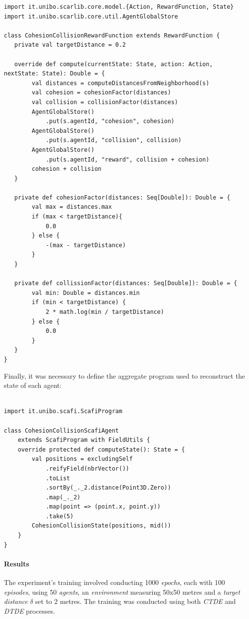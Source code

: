 \documentclass[12pt,a4paper,openright,twoside]{book}
\begin{document}
\begin{lstlisting}
import it.unibo.scarlib.core.model.{Action, RewardFunction, State}
import it.unibo.scarlib.core.util.AgentGlobalStore

class CohesionCollisionRewardFunction extends RewardFunction {
   private val targetDistance = 0.2

   override def compute(currentState: State, action: Action, nextState: State): Double = {
        val distances = computeDistancesFromNeighborhood(s)
        val cohesion = cohesionFactor(distances)
        val collision = collisionFactor(distances)
        AgentGlobalStore()
            .put(s.agentId, "cohesion", cohesion)
        AgentGlobalStore()
            .put(s.agentId, "collision", collision)
        AgentGlobalStore()
            .put(s.agentId, "reward", collision + cohesion)
        cohesion + collision
   }

   private def cohesionFactor(distances: Seq[Double]): Double = {
        val max = distances.max
        if (max < targetDistance){
            0.0
        } else {
            -(max - targetDistance)
        }
   }

   private def collissionFactor(distances: Seq[Double]): Double = {
        val min: Double = distances.min
        if (min < targetDistance) {
            2 * math.log(min / targetDistance)
        } else {
            0.0
        }
   }
}
\end{lstlisting}
Finally, it was necessary to define the aggregate program used to reconstruct the state of each agent:
\begin{lstlisting}

import it.unibo.scafi.ScafiProgram

class CohesionCollisionScafiAgent 
    extends ScafiProgram with FieldUtils {
    override protected def computeState(): State = {
        val positions = excludingSelf
            .reifyField(nbrVector())
            .toList
            .sortBy(_._2.distance(Point3D.Zero))
            .map(_._2)
            .map(point => (point.x, point.y))
            .take(5)
        CohesionCollisionState(positions, mid())
    }
}    
\end{lstlisting}

\paragraph{Results}
The experiment's training involved conducting 1000 \emph{epochs}, each with 100 \emph{episodes}, using 50 \emph{agents}, an 
    \emph{environment} measuring 50x50 metres and a \emph{target distance} $\delta$ set to 2 metres. The training was conducted 
    using both \emph{CTDE} and \emph{DTDE} processes.
\end{document}
